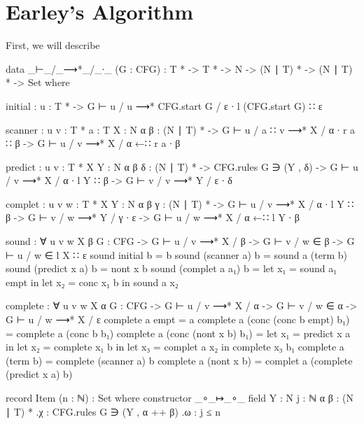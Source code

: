 \chapter{Earley's Algorithm}

	First, we will describe 

	\begin{code}
		data _⊢_/_⟶*_/_∙_ (G : CFG) : 
		  T * -> T * -> N -> (N ∣ T) * -> (N ∣ T) * -> Set where

		  initial : {u : T *} ->
		    G ⊢ u / u ⟶* CFG.start G / ε ∙ l (CFG.start G) ∷ ε
		
		  scanner : {u v : T *} {a : T} {X : N} {α β : (N ∣ T) *} ->
		    G ⊢ u / a ∷ v ⟶* X / α ∙ r a ∷ β ->
		      G ⊢ u / v ⟶* X / α ←∷ r a ∙ β
		
		  predict : {u v : T *} {X Y : N} {α β δ : (N ∣ T) *} ->
		    CFG.rules G ∋ (Y , δ) ->
		    G ⊢ u / v ⟶* X / α ∙ l Y ∷ β ->
		      G ⊢ v / v ⟶* Y / ε ∙ δ
		
		  complet : {u v w : T *} {X Y : N} {α β γ : (N ∣ T) *} ->
		    G ⊢ u / v ⟶* X / α ∙ l Y ∷ β ->
		    G ⊢ v / w ⟶* Y / γ ∙ ε ->
		      G ⊢ u / w ⟶* X / α ←∷ l Y ∙ β
	\end{code}

	\begin{code}

		sound : ∀ {u v w X β} {G : CFG} ->
		  G ⊢ u / v ⟶* X / β ->
		  G ⊢ v / w ∈ β ->
		    G ⊢ u / w ∈ l X ∷ ε
		sound initial b = b
		sound (scanner a) b = sound a (term b)
		sound (predict x a) b = nont x b
		sound (complet a a₁) b =
		  let x₁ = sound a₁ empt in
		  let x₂ = conc x₁ b in
		  sound a x₂

	\end{code}

	\begin{code}
		
		complete : ∀ {u v w X α} {G : CFG} ->
		  G ⊢ u / v ⟶* X / α ->
		  G ⊢ v / w ∈ α ->
		    G ⊢ u / w ⟶* X / ε
		complete a empt = a
		complete a (conc (conc b empt) b₁) = complete a (conc b b₁)
		complete a (conc (nont x b) b₁) =
		  let x₁ = predict x a in
		  let x₂ = complete x₁ b in
		  let x₃ = complet a x₂ in
		  complete x₃ b₁
		complete a (term b) = complete (scanner a) b
		complete a (nont x b) = complet a (complete (predict x a) b)

	\end{code}
	
	\begin{code}

		record Item (n : ℕ) : Set where
		  constructor _∘_↦_∘_
		  field
		    Y : N
		    j : ℕ
		    α β : (N ∣ T) *
		    .{χ} : CFG.rules G ∋ (Y , α ++ β)
		    .{ω} : j ≤ n

	\end{code}

